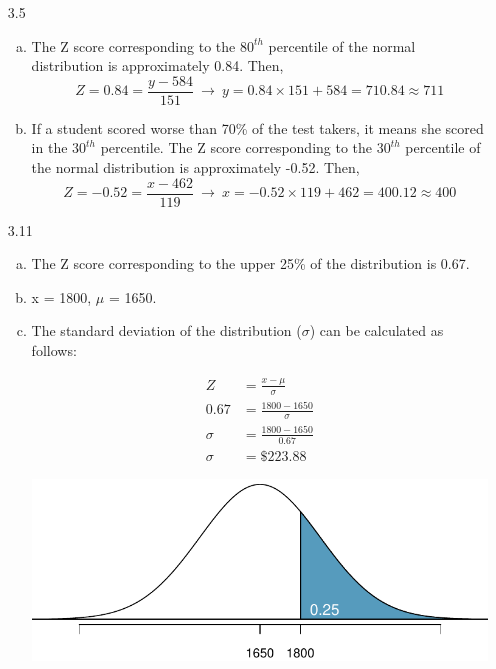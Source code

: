 \documentclass[11pt]{article}
\newenvironment{parts}{
\vspace{-0.25cm}
\begin{enumerate}[(a)]
\setlength{\itemsep}{0mm}
}
{\end{enumerate}
}
\begin{document}
\begin{enumerate}
\item[3.5]
\begin{parts}
\item The Z score corresponding to the $80^{th}$ percentile of the normal distribution is approximately 0.84. Then,
\[ Z = 0.84 = \frac{y - 584}{151} \ \to\ y = 0.84 \times 151 + 584 = 710.84 \approx 711 \]
\item If a student scored worse than 70\% of the test takers, it means she scored in the $30^{th}$ percentile. The Z score corresponding to the $30^{th}$ percentile of the normal distribution is approximately -0.52. Then,
\[ Z = -0.52 = \frac{x - 462}{119} \ \to\ x = -0.52 \times 119 + 462 = 400.12 \approx 400 \]
\end{parts}

\item[3.11] 
\begin{parts}
\item The Z score corresponding to the upper 25\% of the distribution is 0.67.
\item x = 1800, $\mu$ = 1650.
\item The standard deviation of the distribution ($\sigma$) can be calculated as follows: \\
\begin{minipage}[c]{0.5 \textwidth}
\begin{align*}
Z &= \frac{x - \mu}{\sigma} \\
0.67 &= \frac{1800 - 1650}{\sigma} \\
\sigma &= \frac{1800 - 1650}{0.67} \\
\sigma &= \$ 223.88
\end{align*}
\end{minipage}
\begin{minipage}[c]{0.5\textwidth}
\begin{center}
\includegraphics[width=\textwidth]{figures/03/ins_1800}
\end{center}
\end{minipage}
\end{parts}


\end{enumerate}
\end{document}
